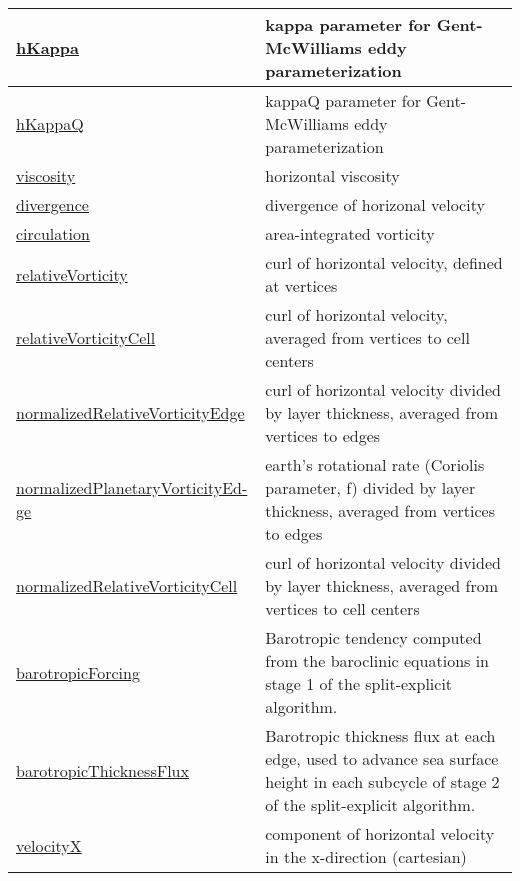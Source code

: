 {\begin{center}
\begin{longtable}{| p{2.0in} | p{4.0in} |}
    \hline
    \hyperref[subsec:var_sec_diagnostics_hKappa]{hKappa} & kappa parameter for Gent-McWilliams eddy parameterization \\
    \hline
    \hyperref[subsec:var_sec_diagnostics_hKappaQ]{hKappaQ} & kappaQ parameter for Gent-McWilliams eddy parameterization \\
    \hline
    \hyperref[subsec:var_sec_diagnostics_viscosity]{viscosity} & horizontal viscosity \\
    \hline
    \hyperref[subsec:var_sec_diagnostics_divergence]{divergence} & divergence of horizonal velocity \\
    \hline
    \hyperref[subsec:var_sec_diagnostics_circulation]{circulation} & area-integrated vorticity \\
    \hline
    \hyperref[subsec:var_sec_diagnostics_relativeVorticity]{relativeVorticity} & curl of horizontal velocity, defined at vertices \\
    \hline
    \hyperref[subsec:var_sec_diagnostics_relativeVorticityCell]{relativeVorticityCell} & curl of horizontal velocity, averaged from vertices to cell centers \\
    \hline
    \hyperref[subsec:var_sec_diagnostics_normalizedRelativeVorticityEdge]{normalizedRelativeVorticityEdge} & curl of horizontal velocity divided by layer thickness, averaged from vertices to edges \\
    \hline
    \hyperref[subsec:var_sec_diagnostics_normalizedPlanetaryVorticityEdge]{normalizedPlanetaryVorticityEd-}\hyperref[subsec:var_sec_diagnostics_normalizedPlanetaryVorticityEdge]{ge  }& earth's rotational rate (Coriolis parameter, f) divided by layer thickness, averaged from vertices to edges \\
    \hline
    \hyperref[subsec:var_sec_diagnostics_normalizedRelativeVorticityCell]{normalizedRelativeVorticityCell} & curl of horizontal velocity divided by layer thickness, averaged from vertices to cell centers \\
    \hline
    \hyperref[subsec:var_sec_diagnostics_barotropicForcing]{barotropicForcing} & Barotropic tendency computed from the baroclinic equations in stage 1 of the split-explicit algorithm. \\
    \hline
    \hyperref[subsec:var_sec_diagnostics_barotropicThicknessFlux]{barotropicThicknessFlux} & Barotropic thickness flux at each edge, used to advance sea surface height in each subcycle of stage 2 of the split-explicit algorithm. \\
    \hline
    \hyperref[subsec:var_sec_diagnostics_velocityX]{velocityX} & component of horizontal velocity in the x-direction (cartesian) \\

\end{longtable}
\end{center}}
